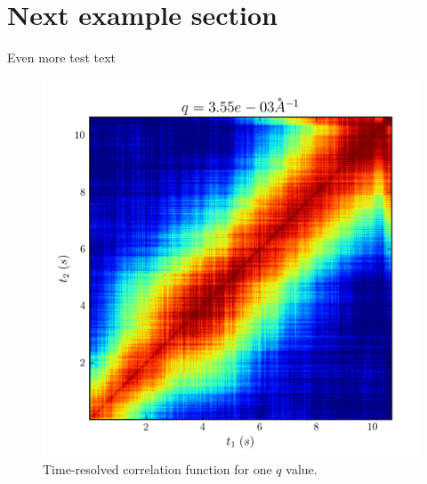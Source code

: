 \section{Next example section}

Even more test text

\begin{figure}[ht]
  \begin{center}
    \includegraphics[width=\textwidth]{dexy--trc.png}
  \end{center}
  \caption{Time-resolved correlation function for one $q$ value.}
  \label{fig:trc}
\end{figure}

